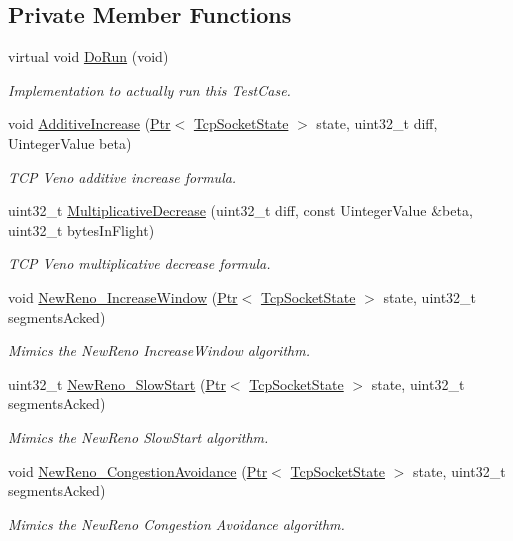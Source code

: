 \subsection*{Private Member Functions}
\begin{DoxyCompactItemize}
\item 
virtual void \hyperlink{classTcpVenoTest_ac9a8c938515295419b597b999c724100}{Do\+Run} (void)
\begin{DoxyCompactList}\small\item\em Implementation to actually run this Test\+Case. \end{DoxyCompactList}\item 
void \hyperlink{classTcpVenoTest_afbbb437669e6d13a95e0de8c0e8a79b0}{Additive\+Increase} (\hyperlink{classns3_1_1Ptr}{Ptr}$<$ \hyperlink{classns3_1_1TcpSocketState}{Tcp\+Socket\+State} $>$ state, uint32\+\_\+t diff, Uinteger\+Value beta)
\begin{DoxyCompactList}\small\item\em T\+CP Veno additive increase formula. \end{DoxyCompactList}\item 
uint32\+\_\+t \hyperlink{classTcpVenoTest_a6c6251834e1354841c6e68dd82bbdc8c}{Multiplicative\+Decrease} (uint32\+\_\+t diff, const Uinteger\+Value \&beta, uint32\+\_\+t bytes\+In\+Flight)
\begin{DoxyCompactList}\small\item\em T\+CP Veno multiplicative decrease formula. \end{DoxyCompactList}\item 
void \hyperlink{classTcpVenoTest_adb94384b4e1993d45709c93642819be4}{New\+Reno\+\_\+\+Increase\+Window} (\hyperlink{classns3_1_1Ptr}{Ptr}$<$ \hyperlink{classns3_1_1TcpSocketState}{Tcp\+Socket\+State} $>$ state, uint32\+\_\+t segments\+Acked)
\begin{DoxyCompactList}\small\item\em Mimics the New\+Reno Increase\+Window algorithm. \end{DoxyCompactList}\item 
uint32\+\_\+t \hyperlink{classTcpVenoTest_aa3390435b7a8316dff0e8f67f65237e6}{New\+Reno\+\_\+\+Slow\+Start} (\hyperlink{classns3_1_1Ptr}{Ptr}$<$ \hyperlink{classns3_1_1TcpSocketState}{Tcp\+Socket\+State} $>$ state, uint32\+\_\+t segments\+Acked)
\begin{DoxyCompactList}\small\item\em Mimics the New\+Reno Slow\+Start algorithm. \end{DoxyCompactList}\item 
void \hyperlink{classTcpVenoTest_a0b135bede498ad6b25f015f59c4d48ab}{New\+Reno\+\_\+\+Congestion\+Avoidance} (\hyperlink{classns3_1_1Ptr}{Ptr}$<$ \hyperlink{classns3_1_1TcpSocketState}{Tcp\+Socket\+State} $>$ state, uint32\+\_\+t segments\+Acked)
\begin{DoxyCompactList}\small\item\em Mimics the New\+Reno Congestion Avoidance algorithm. \end{DoxyCompactList}\end{DoxyCompactItemize}
